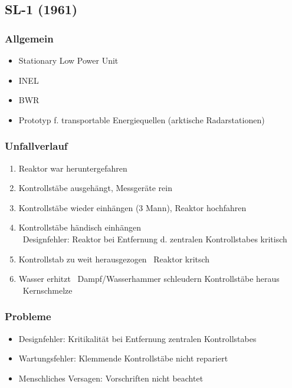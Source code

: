 \documentclass[12pt]{article}
\begin{document}
\subsection{SL-1 (1961)}

\subsubsection{Allgemein}
\begin{itemize}
  \item Stationary Low Power Unit 
  \item INEL
  \item BWR
  \item Prototyp f. transportable Energiequellen (arktische Radarstationen)
\end{itemize}

\subsubsection{Unfallverlauf}
\begin{enumerate}
  \item Reaktor war heruntergefahren
  \item Kontrollstäbe ausgehängt, Messgeräte rein
  \item Kontrollstäbe wieder einhängen (3 Mann), Reaktor hochfahren
  \item Kontrollstäbe händisch einhängen\\
  \textrightarrow\ Designfehler: Reaktor bei Entfernung d. zentralen Kontrollstabes kritisch
  \item Kontrollstab zu weit herausgezogen \textrightarrow\ Reaktor kritsch
  \item Wasser erhitzt \textrightarrow\ Dampf/Wasserhammer schleudern Kontrollstäbe heraus \textrightarrow\ Kernschmelze
\end{enumerate}

\subsubsection{Probleme}
\begin{itemize}
  \item Designfehler: Kritikalität bei Entfernung zentralen Kontrollstabes
  \item Wartungsfehler: Klemmende Kontrollstäbe nicht repariert
  \item Menschliches Versagen: Vorschriften nicht beachtet
\end{itemize}
\end{document}
